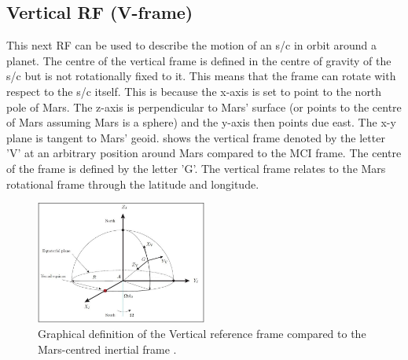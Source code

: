 


\subsection{Vertical \ac{RF} (V-frame)}
\label{subsec:VCNE}
This next \ac{RF} can be used to describe the motion of an \ac{s/c} in orbit around a planet. The centre of the vertical frame is defined in the centre of gravity of the \ac{s/c} \citep{mooij2013fd} but is not rotationally fixed to it. This means that the frame can rotate with respect to the \ac{s/c} itself. This is because the x-axis is set to point to the north pole of Mars. The z-axis is perpendicular to Mars' surface (or points to the centre of Mars assuming Mars is a sphere) and the y-axis then points due east. The x-y plane is tangent to Mars' geoid.  shows the vertical frame denoted by the letter 'V' at an arbitrary position around Mars compared to the \ac{MCI} frame. The centre of the frame is defined by the letter 'G'. The vertical frame relates to the Mars rotational frame through the latitude and longitude. 

\begin{figure}[!ht]
\centering
\includegraphics[width=0.5\textwidth]{figures/reference_frames/vcne_mooij2013fd.jpg}
\caption{Graphical definition of the Vertical reference frame compared to the Mars-centred inertial frame \citep{mooij2013fd}.}
\label{fig:vcne_mooij2013fd}
\end{figure} 


